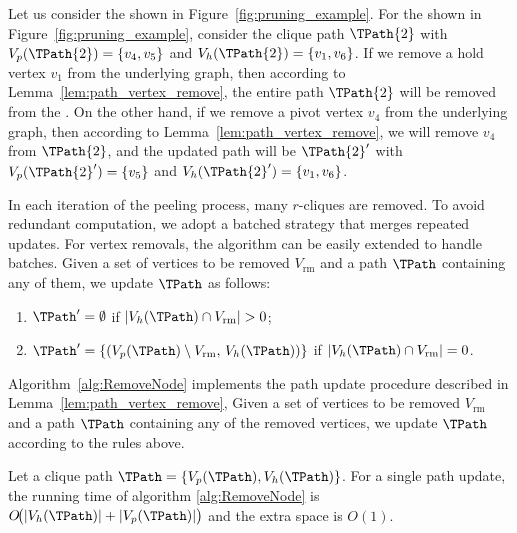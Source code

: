\begin{example}
Let us consider the \cpi shown in Figure~\ref{fig:pruning_example}. For the \cpi shown in Figure~\ref{fig:pruning_example}, consider the clique path $\TPath{2}$ with
$V_{p}(\TPath{2}) = \{v_4, v_5\}$ and $V_{h}(\TPath{2}) = \{v_1, v_6\}$. 
If we remove a hold vertex $v_1$ from the underlying graph, then according to Lemma~\ref{lem:path_vertex_remove}, the entire path $\TPath{2}$ will be removed from the \cpi. On the other hand, if we remove a pivot vertex $v_4$ from the underlying graph, then according to Lemma~\ref{lem:path_vertex_remove}, we will remove $v_4$ from $\TPath{2}$, and the updated path will be $\TPath{2}'$ with $V_{p}(\TPath{2}') = \{v_5\}$ and $V_{h}(\TPath{2}') = \{v_1, v_6\}$.
\end{example}


\small



In each iteration of the peeling process, many $r$-cliques are removed. 
To avoid redundant computation, we adopt a batched strategy that merges repeated updates. 
For vertex removals, the algorithm can be easily extended to handle batches. 
Given a set of vertices to be removed $V_{\mathrm{rm}}$ and a path $\TPath$ containing any of them, we update $\TPath$ as follows:
\begin{enumerate}[leftmargin=*]
    \item $\TPath' = \emptyset$ if $|V_h(\TPath) \cap V_{\mathrm{rm}}| > 0$;
    \item $\TPath' = \{(V_p(\TPath) \setminus V_{\mathrm{rm}},\, V_h(\TPath))\}$ if $|V_h(\TPath) \cap V_{\mathrm{rm}}| = 0$.
\end{enumerate}



Algorithm~\ref{alg:RemoveNode} implements the path update procedure described in Lemma~\ref{lem:path_vertex_remove},
Given a set of vertices to be removed $V_{\mathrm{rm}}$ and a path $\TPath$ containing any of the removed vertices, we update $\TPath$ according to the rules above.


Let a clique path $\TPath = \{V_p(\TPath), V_h(\TPath)\}$.
For a single path update, the running time of algorithm \ref{alg:RemoveNode} is $O\!\big(|V_h(\TPath)|+|V_p(\TPath)|\big)$
and the extra space is $O(1)$.